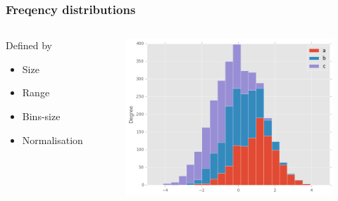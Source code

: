 \documentclass[10pt, compress]{beamer}
\begin{document}
\begin{frame}
    \frametitle{Freqency distributions}
    \begin{columns}
        \begin{block}{Defined by}
            \begin{itemize}
                \item Size
                \item Range
                \item Bins-size
                \item Normalisation
            \end{itemize}
        \end{block}
        \begin{block}{}
            \begin{figure}
                \begin{center}
                    \includegraphics[scale=0.3]{img/hist_new_stacked.png}
                \end{center}
            \end{figure}
        \end{block}
    \end{columns}
\end{frame}
\end{document}
